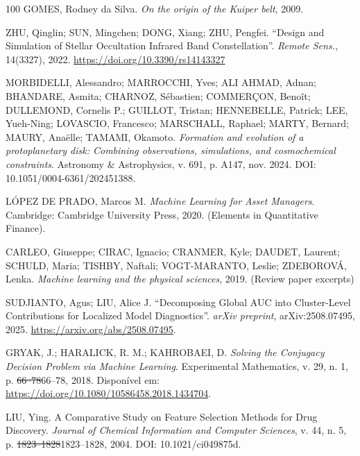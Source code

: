 \documentclass[msc]{on} %
\makeatletter
\providecommand{\DIFaddtex}[1]{{\protect\color{red}#1}} %
\providecommand{\DIFdeltex}[1]{{\protect\color{red}\sout{#1}}} %
\providecommand{\DIFaddbegin}{} %
\providecommand{\DIFaddend}{} %
\providecommand{\DIFdelbegin}{} %
\providecommand{\DIFdelend}{} %
\providecommand{\DIFadd}[1]{\texorpdfstring{\DIFaddtex{#1}}{#1}} %
\providecommand{\DIFdel}[1]{\texorpdfstring{\DIFdeltex{#1}}{}} %
\let\sout@orig\sout %
\renewcommand{\sout}[1]{\ifmmode\text{\sout@orig{\ensuremath{#1}}}\else\sout@orig{#1}\fi} %
\makeatother
\begin{document}
\begin{thebibliography}{100}
 GOMES, Rodney da Silva. \textit{On the origin of the Kuiper belt}, 2009.

 ZHU, Qinglin; SUN, Mingchen; DONG, Xiang; ZHU, Pengfei. ``Design and Simulation of Stellar Occultation Infrared Band Constellation''. \emph{Remote Sens.}, 14(3327), 2022. \url{https://doi.org/10.3390/rs14143327}

 MORBIDELLI, Alessandro; MARROCCHI, Yves; ALI AHMAD, Adnan; BHANDARE, Asmita; CHARNOZ, S\'ebastien; COMMER\c{C}ON, Beno\^it; DULLEMOND, Cornelis P.; GUILLOT, Tristan; HENNEBELLE, Patrick; LEE, Yueh-Ning; LOVASCIO, Francesco; MARSCHALL, Raphael; MARTY, Bernard; MAURY, Ana\"elle; TAMAMI, Okamoto. \textit{Formation and evolution of a protoplanetary disk: Combining observations, simulations, and cosmochemical constraints}. Astronomy \& Astrophysics, v. 691, p. A147, nov. 2024. DOI: 10.1051/0004-6361/202451388.

 LÓPEZ DE PRADO, Marcos M. \textit{Machine Learning for Asset Managers}. Cambridge: Cambridge University Press, 2020. (Elements in Quantitative Finance).

 CARLEO, Giuseppe; CIRAC, Ignacio; CRANMER, Kyle; DAUDET, Laurent; SCHULD, Maria; TISHBY, Naftali; VOGT-MARANTO, Leslie; ZDEBOROVÁ, Lenka. \textit{Machine learning and the physical sciences}, 2019. (Review paper excerpts)

 SUDJIANTO, Agus; LIU, Alice J. ``Decomposing Global AUC into Cluster-Level Contributions for Localized Model Diagnostics''. \emph{arXiv preprint}, arXiv:2508.07495, 2025. \url{https://arxiv.org/abs/2508.07495}.

 GRYAK, J.; HARALICK, R. M.; KAHROBAEI, D. \textit{Solving the Conjugacy Decision Problem via Machine Learning}. Experimental Mathematics, v. 29, n. 1, p. \DIFdelbegin \DIFdel{66–78}\DIFdelend\ifhmode\hskip0pt\fi \DIFaddbegin \DIFadd{66--78}\DIFaddend , 2018. Disponível em: \url{https://doi.org/10.1080/10586458.2018.1434704}.

 LIU, Ying. A Comparative Study on Feature Selection Methods for Drug Discovery. \textit{Journal of Chemical Information and Computer Sciences}, v. 44, n. 5, p. \DIFdelbegin \DIFdel{1823–1828}\DIFdelend\ifhmode\hskip0pt\fi \DIFaddbegin \DIFadd{1823--1828}\DIFaddend , 2004. DOI: 10.1021/ci049875d.


\end{thebibliography}
\end{document}
